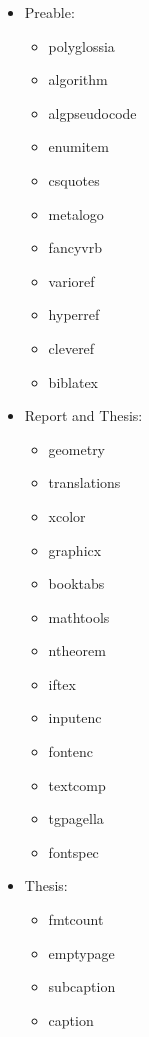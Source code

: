 \documentclass[twocolumn]{mlai-guide}
\begin{document}
\begin{itemize}
	\item Preable:
	\begin{itemize}
		\item polyglossia
		\item algorithm
		\item algpseudocode
		\item enumitem
		\item csquotes
		\item metalogo
		\item fancyvrb
		\item varioref
		\item hyperref
		\item cleveref
		\item biblatex 
	\end{itemize}
	\item Report and Thesis:
	\begin{itemize}
		\item geometry
		\item translations
		\item xcolor
		\item graphicx
		\item booktabs
		\item mathtools
		\item ntheorem
		\item iftex
		\item inputenc
		\item fontenc
		\item textcomp
		\item tgpagella
		\item fontspec
	\end{itemize}
	\item Thesis:
	\begin{itemize}
		\item fmtcount
		\item emptypage
		\item subcaption
		\item caption
	\end{itemize}
\end{itemize}
\end{document}

